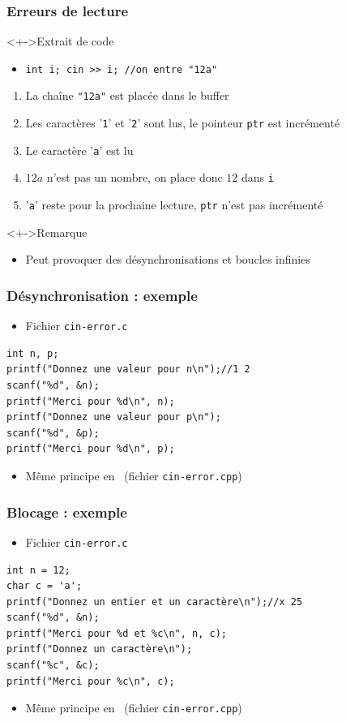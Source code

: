 \begin{frame}
\frametitle{Erreurs de lecture}
\begin{exampleblock}<+->{Extrait de code}
	\begin{itemize}[<+->]
	\item \lstinline|int i; cin >> i; //on entre "12a"|
	\end{itemize}
\end{exampleblock}
\begin{enumerate}[<+->]
\item La chaîne \lstinline|"12a"| est placée dans le buffer
\item Les caractères '\texttt{1}' et '\texttt{2}' sont lus, le pointeur \texttt{ptr} est incrémenté
\item Le caractère '\texttt{a}' est lu
\item $12a$ n'est pas un nombre, on place donc $12$ dans \texttt{i}
\item '\texttt{a}' reste pour la prochaine lecture, \texttt{ptr} n'est pas incrémenté
\end{enumerate}
\begin{alertblock}<+->{Remarque}
	\begin{itemize}
	\item Peut provoquer des désynchronisations et boucles infinies
	\end{itemize}
\end{alertblock}
\end{frame}

\begin{frame}[containsverbatim]
\frametitle{Désynchronisation : exemple}
\begin{itemize}
\item Fichier \texttt{cin-error.c}
\end{itemize}
\begin{lstlisting}
int n, p;
printf("Donnez une valeur pour n\n");//1 2
scanf("%d", &n);
printf("Merci pour %d\n", n);
printf("Donnez une valeur pour p\n");
scanf("%d", &p);
printf("Merci pour %d\n", p);
\end{lstlisting}
\begin{itemize}
\item Même principe en \cpp~(fichier \texttt{cin-error.cpp})
\end{itemize}
\end{frame}

\begin{frame}[containsverbatim]
\frametitle{Blocage : exemple}
\begin{itemize}
\item Fichier \texttt{cin-error.c}
\end{itemize}
\begin{lstlisting}
int n = 12;
char c = 'a';
printf("Donnez un entier et un caractère\n");//x 25
scanf("%d", &n);	
printf("Merci pour %d et %c\n", n, c);
printf("Donnez un caractère\n");
scanf("%c", &c);
printf("Merci pour %c\n", c);
\end{lstlisting}
\begin{itemize}
\item Même principe en \cpp~(fichier \texttt{cin-error.cpp})
\end{itemize}
\end{frame}

